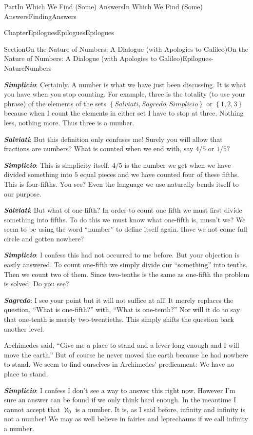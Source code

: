\documentclass[oneside,10pt,]{book}
\newcommand{\alert}[1]{\textbf{\textit{#1}}}
\numberwithin{equation}{part}
\begin{document}
\begin{partptx}{Part}{In Which We Find (Some) Answers}{}{In Which We Find (Some) Answers}{}{}{FindingAnswers}
\begin{chapterptx}{Chapter}{Epilogues}{}{Epilogues}{}{}{Epilogues}
\begin{sectionptx}{Section}{On the Nature of Numbers: A Dialogue (with Apologies to Galileo)}{}{On the Nature of Numbers: A Dialogue (with Apologies to Galileo)}{}{}{Epilogues-NatureNumbers}
\begin{introduction}{}
\par
\alert{Simplicio}:  Certainly. A number is what we have just been discussing. It is what you have when you stop counting. For example, three is the totality (to use your phrase) of the elements of the sets \(\left\{Salviati, Sagredo, Simplicio\right\}\) or \(\left\{1, 2, 3\right\}\) because when I count the elements in either set I have to stop at three. Nothing less, nothing more. Thus three is a number.%
\par
\alert{Salviati}:  But this definition only confuses me! Surely you will allow that fractions are numbers? What is counted when we end with, say \(4/5\) or \(1/5?\)%
\par
\alert{Simplicio}:  This is simplicity itself. \(4/5\) is the number we get when we have divided something into \(5\) equal pieces and we have counted four of these fifths. This is four-fifths. You see? Even the language we use naturally bends itself to our purpose.%
\par
\alert{Salviati}:  But what of one-fifth? In order to count one fifth we must first divide something into fifths. To do this we must know what one-fifth is, musn't we? We seem to be using the word ``number'' to define itself again. Have we not come full circle and gotten nowhere?%
\par
\alert{Simplicio}:  I confess this had not occurred to me before. But your objection is easily answered. To count one-fifth we simply divide our ``something'' into tenths. Then we count two of them. Since two-tenths is the same as one-fifth the problem is solved. Do you see?%
\par
\alert{Sagredo}:  I see your point but it will not suffice at all! It merely replaces the question, ``What is one-fifth?'' with, ``What is one-tenth?'' Nor will it do to say that one-tenth is merely two-twentieths. This simply shifts the question back another level.%
\par
Archimedes said, ``Give me a place to stand and a lever long enough and I will move the earth.'' But of course he never moved the earth because he had nowhere to stand. We seem to find ourselves in Archimedes' predicament: We have no place to stand.%
\par
\alert{Simplicio}:  I confess I don't see a way to answer this right now. However I'm sure an answer can be found if we only think hard enough. In the meantime I cannot accept that \(\aleph_0\) is a number. It is, as I said before, infinity and infinity is not a number! We may as well believe in fairies and leprechauns if we call infinity a number.%

\end{introduction}
\end{sectionptx}
\end{chapterptx}
\end{partptx}
\end{document}
